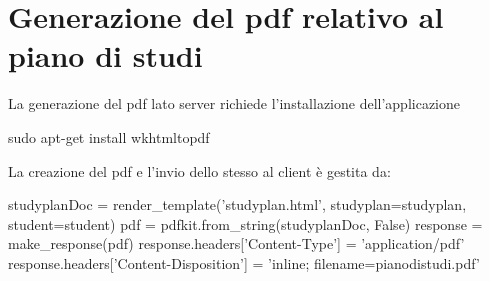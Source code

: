 \documentclass{article}
\begin{document}
\section{Generazione del pdf relativo al piano di studi}
La generazione del pdf lato server richiede l'installazione dell'applicazione
\begin{shell}
sudo apt-get install wkhtmltopdf
\end{shell}
La creazione del pdf e l'invio dello stesso al client è gestita da:
\begin{python}
	studyplanDoc = render_template('studyplan.html', studyplan=studyplan, student=student)
    pdf = pdfkit.from_string(studyplanDoc, False)
    response = make_response(pdf)
    response.headers['Content-Type'] = 'application/pdf'
    response.headers['Content-Disposition'] = 'inline; filename=pianodistudi.pdf'
\end{python}

\newpage
\end{document}
